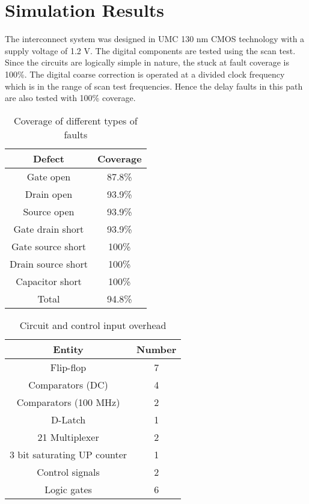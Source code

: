 \documentclass[conference]{IEEEtran}
\begin{document}
\section{Simulation Results}
The interconnect system was designed in UMC 130 nm CMOS technology with a 
supply voltage of 1.2 V. The digital components are tested using the scan test.
Since the circuits are logically simple in nature, the stuck at fault
coverage is 100\%. The digital coarse correction is operated at a divided clock 
frequency which is in the range of scan test frequencies. Hence the delay
faults in this path are also tested with 100\% coverage. 



\begin{table}[h]
\begin{center}
\caption{Coverage of different types of faults}
\label{tbl:coverage}
\begin{tabular}{|c|c|}
\hline
Defect & Coverage \\ \hline
Gate open & 87.8\% \\ 
Drain open & 93.9\% \\ 
Source open & 93.9\% \\
Gate drain short & 93.9\% \\ 
Gate source short & 100\% \\ 
Drain source short & 100\% \\
Capacitor short & 100\% \\ \hline
Total & 94.8\% \\ \hline
\end{tabular}
\end{center}
\end{table}

\begin{table}[h]
\begin{center}
\caption{Circuit and control input overhead}
\label{tbl:ckt-overhead}
\begin{tabular}{|c|c|}
\hline
Entity & Number \\ \hline
Flip-flop & 7 \\
Comparators (DC) & 4 \\
Comparators (100 MHz) & 2 \\
D-Latch & 1 \\
21 Multiplexer & 2 \\
3 bit saturating UP counter & 1 \\
Control signals & 2 \\
Logic gates & 6 \\ \hline
\end{tabular}
\end{center}
\end{table}
\end{document}
